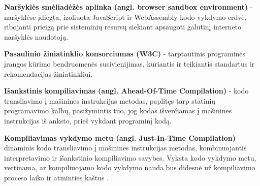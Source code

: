 \documentclass{VUMIFPSkursinis}
\begin{document}
\textbf{Naršyklės smėliadėžės aplinka (angl. browser sandbox environment)} - naršyklėse įdiegta, izoliuota JavaScript ir WebAssembly kodo vykdymo erdvė, ribojanti prieigą prie sisteminių resursų siekiant apsaugoti galutinį interneto naršyklės naudotoją.

\textbf{Pasaulinio žiniatinklio konsorciumas (W3C)} - tarptautinis programinės įrangos kūrimo bendruomenės susivienijimas, kuriantis ir teikiantis standartus ir rekomendacijas žiniatinkliui. \cite{W3C19}

\textbf{Išankstinis kompiliavimas (angl. Ahead-Of-Time Compilation)} - kodo transliavimo į mašinines instrukcijas metodas, paplitęs tarp statinių programavimo kalbų, pasižymintis tuo, jog kodas išverčiamas į mašinines instrukcijas iš anksto, prieš vykdant programinį kodą. \cite{Abo17}

\textbf{Kompiliavimas vykdymo metu (angl. Just-In-Time Compilation)} - dinaminis kodo transliavimo į mašinines instrukcijas metodas, kombinuojantis interpretavimo ir išankstinio kompiliavimo savybes. Vyksta kodo vykdymo metu, vertinama, ar kompiliuojamo kodo vykdymo nauda bus didesnė už kompiliavimo proceso laiko ir atminties kaštus \cite{Abo17}.
\end{document}
